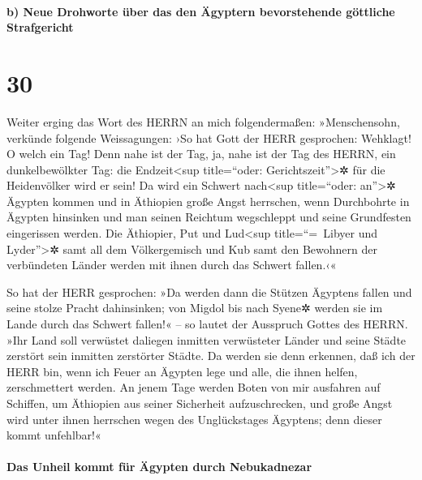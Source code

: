 \hypertarget{b-neue-drohworte-uxfcber-das-den-uxe4gyptern-bevorstehende-guxf6ttliche-strafgericht}{%
\paragraph{b) Neue Drohworte über das den Ägyptern bevorstehende
göttliche
Strafgericht}\label{b-neue-drohworte-uxfcber-das-den-uxe4gyptern-bevorstehende-guxf6ttliche-strafgericht}}

\hypertarget{section-29}{%
\section{30}\label{section-29}}

Weiter erging das Wort des HERRN an mich folgendermaßen:
»Menschensohn, verkünde folgende Weissagungen: ›So hat
Gott der HERR gesprochen: Wehklagt! O welch ein Tag! Denn
nahe ist der Tag, ja, nahe ist der Tag des HERRN, ein dunkelbewölkter
Tag: die Endzeit\textless sup title=``oder: Gerichtszeit''\textgreater✲
für die Heidenvölker wird er sein! Da wird ein Schwert
nach\textless sup title=``oder: an''\textgreater✲ Ägypten kommen und in
Äthiopien große Angst herrschen, wenn Durchbohrte in Ägypten hinsinken
und man seinen Reichtum wegschleppt und seine Grundfesten eingerissen
werden. Die Äthiopier, Put und Lud\textless sup
title=``=~Libyer und Lyder''\textgreater✲ samt all dem Völkergemisch und
Kub samt den Bewohnern der verbündeten Länder werden mit ihnen durch das
Schwert fallen.‹«

So hat der HERR gesprochen: »Da werden dann die Stützen
Ägyptens fallen und seine stolze Pracht dahinsinken; von Migdol bis nach
Syene✲ werden sie im Lande durch das Schwert fallen!« -- so lautet der
Ausspruch Gottes des HERRN. »Ihr Land soll verwüstet
daliegen inmitten verwüsteter Länder und seine Städte zerstört sein
inmitten zerstörter Städte. Da werden sie denn erkennen,
daß ich der HERR bin, wenn ich Feuer an Ägypten lege und alle, die ihnen
helfen, zerschmettert werden. An jenem Tage werden Boten
von mir ausfahren auf Schiffen, um Äthiopien aus seiner Sicherheit
aufzuschrecken, und große Angst wird unter ihnen herrschen wegen des
Unglückstages Ägyptens; denn dieser kommt unfehlbar!«

\hypertarget{das-unheil-kommt-fuxfcr-uxe4gypten-durch-nebukadnezar}{%
\paragraph{Das Unheil kommt für Ägypten durch
Nebukadnezar}\label{das-unheil-kommt-fuxfcr-uxe4gypten-durch-nebukadnezar}}


